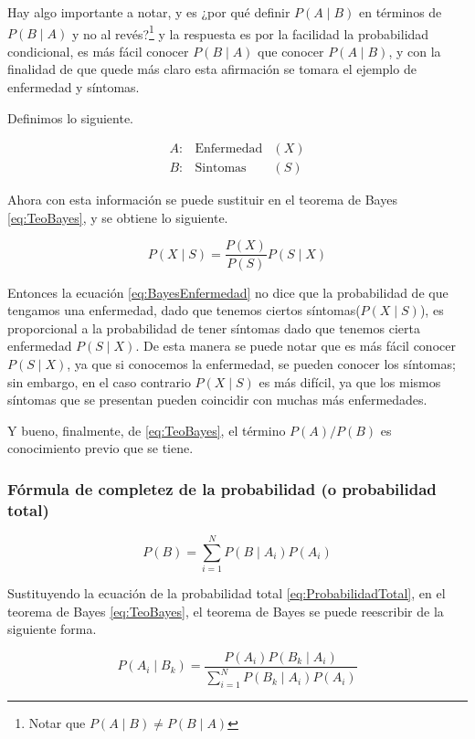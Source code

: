 Hay algo importante a notar, y es ¿por qué definir $P(A\mid B)$ en términos de $P(B\mid A)$ y no al revés?\footnote{Notar que $P(A\mid B) \neq P(B\mid A)$} y la respuesta es por la facilidad la probabilidad condicional, es más fácil conocer $P(B\mid A)$ que conocer $P(A\mid B)$, y con la finalidad de que quede más claro esta afirmación se tomara el ejemplo de  enfermedad y síntomas.

Definimos lo siguiente.

\begin{align*}
    A:&\text{Enfermedad}&(X)\\
    B:& \text{Sintomas}&(S)
\end{align*}

Ahora con esta información se puede sustituir en el teorema de Bayes \eqref{eq:TeoBayes}, y se obtiene lo siguiente.

\begin{equation}
    P(X\mid S) = \frac{P(X)}{P(S)}P(S\mid X)
    \label{eq:BayesEnfermedad}
\end{equation}

Entonces la ecuación \eqref{eq:BayesEnfermedad} no dice que la probabilidad de que tengamos una enfermedad, dado que tenemos ciertos síntomas($P(X\mid S)$), es proporcional a la probabilidad de tener síntomas dado que tenemos cierta enfermedad $P(S\mid X)$. De esta manera se puede notar que es más fácil conocer $P(S\mid X)$, ya que si conocemos la enfermedad, se pueden conocer los síntomas; sin embargo, en el caso contrario $P(X\mid S)$ es más difícil, ya que los mismos síntomas que se presentan pueden coincidir con muchas más enfermedades.

Y bueno, finalmente, de \eqref{eq:TeoBayes}, el término $P(A)/P(B)$ es conocimiento previo que se tiene.

\subsubsection{Fórmula de completez de la probabilidad (o probabilidad total)}

\begin{equation}
    P(B) = \sum_{i=1}^NP(B\mid A_i)P(A_i)
    \label{eq:ProbabilidadTotal}
\end{equation}

Sustituyendo la ecuación de la probabilidad total \eqref{eq:ProbabilidadTotal}, en el teorema de Bayes \eqref{eq:TeoBayes}, el teorema de Bayes se puede reescribir de la siguiente forma.

\begin{equation}
    P(A_i\mid B_k) = \frac{P(A_i)P(B_k\mid A_i)}{\sum_{i=1}^N P(B_k\mid A_i)P(A_i)}
    \label{eq:Causa-Efecto}
\end{equation}



